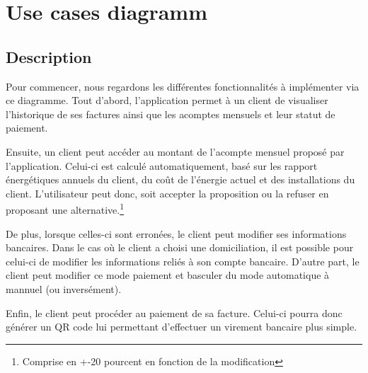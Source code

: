 \section{Use cases diagramm}
\subsection{Description}
\begin{flushleft}
Pour commencer, nous regardons les différentes fonctionnalités à implémenter via ce diagramme. Tout d'abord, l'application permet à un client de visualiser l'historique de ses factures ainsi que les acomptes mensuels et leur statut de paiement.
\end{flushleft}

\begin{flushleft}
Ensuite, un client peut accéder au montant de l'acompte mensuel proposé par l'application. Celui-ci est calculé automatiquement, basé sur les rapport énergétiques annuels du client, du coût de l'énergie actuel et des installations du client. L'utilisateur peut donc, soit accepter la proposition ou la refuser en proposant une alternative.\footnote{Comprise en +-20 pourcent en fonction de la modification}
\end{flushleft}

\begin{flushleft}
De plus, lorsque celles-ci sont erronées, le client peut modifier ses informations bancaires. Dans le cas où le client a choisi une domiciliation, il est possible pour celui-ci de modifier les informations reliés à son compte bancaire.
D'autre part, le client peut modifier ce mode paiement et basculer du mode automatique à mannuel (ou inversément).
\end{flushleft}

\begin{flushleft}
Enfin, le client peut procéder au paiement de sa facture. Celui-ci pourra donc générer un QR code lui permettant d'effectuer un virement bancaire plus simple.
\end{flushleft}

